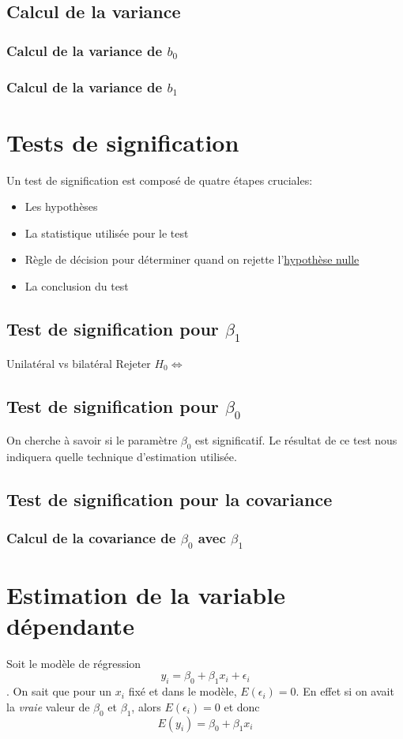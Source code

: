 \documentclass[12pt]{book}
\newcommand\todo[1]{\phantom{#1}}
\theoremstyle{definition}
\begin{document}
\section{Calcul de la variance}
\subsection{Calcul de la variance de $b_0$}
\subsection{Calcul de la variance de $b_1$}
\chapter{Tests de signification}
Un test de signification est composé de quatre étapes cruciales:
\begin{itemize}
    \item Les hypothèses
    \item La statistique utilisée pour le test
    \item Règle de décision pour déterminer quand on rejette l'\hyperref[def:hypothese_nulle]{hypothèse nulle}
    \item La conclusion du test
\end{itemize}

\section{Test de signification pour $\beta_1$}
Unilatéral vs bilatéral
Rejeter $H_0 \iff $
\section{Test de signification pour $\beta_0$}
On cherche à savoir si le paramètre $\beta_0$ est significatif. Le résultat de ce test 
nous indiquera quelle technique d'estimation utilisée.
\section{Test de signification pour la covariance}
\subsection{Calcul de la covariance de $\beta_0$ avec $\beta_1$}
\chapter{Estimation de la variable dépendante}
Soit le modèle de régression \todo{Add link} $$y_i = \beta_0 + \beta_1x_i + \epsilon_i$$.
On sait que pour un $x_i$ fixé et dans le modèle, $E(\epsilon_i) = 0$. En effet si on avait 
la \textit{vraie} valeur de $\beta_0$ et $\beta_1$, alors $E(\epsilon_i) = 0$ et donc 
$$E(y_i) = \beta_0 + \beta_1x_i$$
\end{document}
